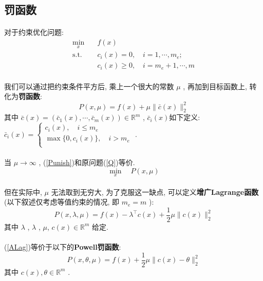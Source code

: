 \documentclass[UTF8]{ctexart}
\renewcommand{\b}{\textbf}
\newcommand{\equSplit}[1]{\begin{equation}\begin{split}#1\end{split}\end{equation}}
\newcommand{\equ}[1]{\begin{equation}#1\end{equation}}
\newcommand{\Tst}{\text{s.t.}\quad}
\newcommand{\norm}[1]{\lVert#1\rVert}
\newcommand{\Real}[1]{\mathbb{R}^{#1}}
\numberwithin{equation}{section}
\begin{document}
		\subsection{罚函数}
			\paragraph{}
				\quad 对于约束优化问题:
				\equSplit{\label{Q}
					\min_x \quad
						& f(x)\\
					\Tst
						& c_i(x) = 0, \quad i = 1, \cdots, m_e;\\
						& c_i(x) \ge 0, \quad i = m_e + 1, \cdots, m
				}
			\paragraph{}
				\quad 我们可以通过把约束条件平方后, 乘上一个很大的常数 $\mu$ , 再加到目标函数上, 转化为\b{罚函数}:
				\equ{
					P(x, \mu) = f(x) + \mu \norm{\bar{c}(x)}^2_2
				}
				其中
				$
						\bar{c}(x)
					=	(\bar{c}_1(x), \cdots, \bar{c}_m(x))
					\in	\Real{m}
				$ , \quad
				$\bar{c}_i(x)$如下定义:
				$
						\bar{c}_i(x)
					=	\begin{cases}
							c_i(x), \quad i \leq m_e\\
							\max \{0, c_i(x)\}, \quad i > m_e \\
						\end{cases}
				$ .
			\paragraph{}
				\quad 当 $\mu \rightarrow \infty$ , (\ref{Punish})和原问题(\ref{Q})等价.
				\equ{\label{Punish}
					\min_x \quad P(x,\mu)
				}

			\paragraph{}
				\quad 但在实际中, $\mu$ 无法取到无穷大, 为了克服这一缺点, 可以定义\b{增广Lagrange函数}(以下叙述仅考虑等值约束的情况, 即 $m_e = m$ ):
				\equ{\label{ALag}
						P(x, \lambda, \mu)
					=	f(x) - \lambda^\top c(x) + \frac{1}{2} \mu \norm{c(x)}^2_2
				}
				其中 $\lambda$ , $\lambda$ , $\mu$, $c(x) \in \Real{m}$ 给定.

			\paragraph{}
				\quad (\ref{ALag})等价于以下的\b{Powell罚函数}:
				\equ{\label{Pow}
						P(x, \theta, \mu)
					=	f(x) + \frac{1}{2} \mu \norm{c(x) - \theta}^2_2
				}
				其中 $c(x) , \theta \in \Real{m}$ .
\end{document}
